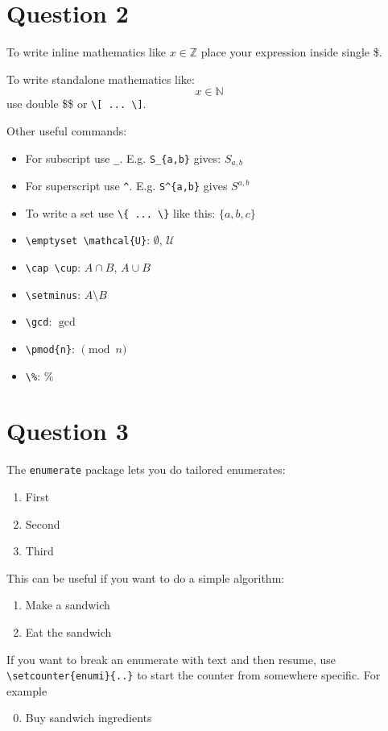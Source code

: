 \documentclass{article} %
\begin{document}
\section*{Question 2}
To write inline mathematics like $x \in \mathbb{Z}$ place your expression inside single \$.

To write standalone mathematics like:
\[ x \in \mathbb{N} \]
use double \$\$ or \verb|\[ ... \]|.

Other useful commands: 
\begin{itemize}
\item For subscript use \verb|_|.  E.g. \verb|S_{a,b}| gives: $S_{a,b}$
\item For superscript use \verb|^|.  E.g. \verb|S^{a,b}| gives $S^{a,b}$
\item To write a set use \verb|\{ ... \}| like this: $\{a,b,c\}$
\item \verb|\emptyset \mathcal{U}|: $\emptyset$, $\mathcal{U}$ 
\item \verb|\cap \cup|: $A \cap B$, $A \cup B$
\item \verb|\setminus|: $A \setminus B$ 
\item \verb|\gcd|: $\gcd$
\item \verb|\pmod{n}|: $\pmod{n}$
\item \verb|\%|: $\%$
\end{itemize}


\section*{Question 3}
The \texttt{enumerate} package lets you do tailored enumerates:
\begin{enumerate}[I]
\item First
\item Second
\item Third
\end{enumerate}

This can be useful if you want to do a simple algorithm:
\begin{enumerate}[Step 1. ]
\item Make a sandwich
\item Eat the sandwich
\end{enumerate}

If you want to break an enumerate with text and then resume, use \verb|\setcounter{enumi}{..}| to start the counter from somewhere specific.  For example
\begin{enumerate}[Step 1. ]
\setcounter{enumi}{-1}
\item Buy sandwich ingredients
\end{enumerate} 
\end{document}
